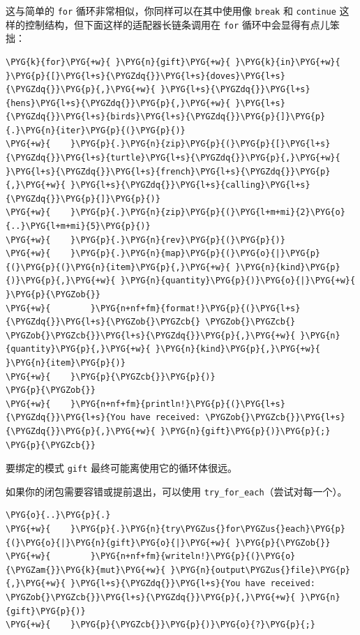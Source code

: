 这与简单的 \texttt{for} 循环非常相似，你同样可以在其中使用像 \texttt{break} 和 \texttt{continue} 这样的控制结构，但下面这样的适配器长链条调用在 \texttt{for} 循环中会显得有点儿笨拙：

\begin{Verbatim}[commandchars=\\\{\},breaklines=true,breakanywhere=true,fontsize=\codefont,xleftmargin=17bp]
\PYG{k}{for}\PYG{+w}{ }\PYG{n}{gift}\PYG{+w}{ }\PYG{k}{in}\PYG{+w}{ }\PYG{p}{[}\PYG{l+s}{\PYGZdq{}}\PYG{l+s}{doves}\PYG{l+s}{\PYGZdq{}}\PYG{p}{,}\PYG{+w}{ }\PYG{l+s}{\PYGZdq{}}\PYG{l+s}{hens}\PYG{l+s}{\PYGZdq{}}\PYG{p}{,}\PYG{+w}{ }\PYG{l+s}{\PYGZdq{}}\PYG{l+s}{birds}\PYG{l+s}{\PYGZdq{}}\PYG{p}{]}\PYG{p}{.}\PYG{n}{iter}\PYG{p}{(}\PYG{p}{)}
\PYG{+w}{    }\PYG{p}{.}\PYG{n}{zip}\PYG{p}{(}\PYG{p}{[}\PYG{l+s}{\PYGZdq{}}\PYG{l+s}{turtle}\PYG{l+s}{\PYGZdq{}}\PYG{p}{,}\PYG{+w}{ }\PYG{l+s}{\PYGZdq{}}\PYG{l+s}{french}\PYG{l+s}{\PYGZdq{}}\PYG{p}{,}\PYG{+w}{ }\PYG{l+s}{\PYGZdq{}}\PYG{l+s}{calling}\PYG{l+s}{\PYGZdq{}}\PYG{p}{]}\PYG{p}{)}
\PYG{+w}{    }\PYG{p}{.}\PYG{n}{zip}\PYG{p}{(}\PYG{l+m+mi}{2}\PYG{o}{..}\PYG{l+m+mi}{5}\PYG{p}{)}
\PYG{+w}{    }\PYG{p}{.}\PYG{n}{rev}\PYG{p}{(}\PYG{p}{)}
\PYG{+w}{    }\PYG{p}{.}\PYG{n}{map}\PYG{p}{(}\PYG{o}{|}\PYG{p}{(}\PYG{p}{(}\PYG{n}{item}\PYG{p}{,}\PYG{+w}{ }\PYG{n}{kind}\PYG{p}{)}\PYG{p}{,}\PYG{+w}{ }\PYG{n}{quantity}\PYG{p}{)}\PYG{o}{|}\PYG{+w}{ }\PYG{p}{\PYGZob{}}
\PYG{+w}{        }\PYG{n+nf+fm}{format!}\PYG{p}{(}\PYG{l+s}{\PYGZdq{}}\PYG{l+s}{\PYGZob{}\PYGZcb{} \PYGZob{}\PYGZcb{} \PYGZob{}\PYGZcb{}}\PYG{l+s}{\PYGZdq{}}\PYG{p}{,}\PYG{+w}{ }\PYG{n}{quantity}\PYG{p}{,}\PYG{+w}{ }\PYG{n}{kind}\PYG{p}{,}\PYG{+w}{ }\PYG{n}{item}\PYG{p}{)}
\PYG{+w}{    }\PYG{p}{\PYGZcb{}}\PYG{p}{)}
\PYG{p}{\PYGZob{}}
\PYG{+w}{    }\PYG{n+nf+fm}{println!}\PYG{p}{(}\PYG{l+s}{\PYGZdq{}}\PYG{l+s}{You have received: \PYGZob{}\PYGZcb{}}\PYG{l+s}{\PYGZdq{}}\PYG{p}{,}\PYG{+w}{ }\PYG{n}{gift}\PYG{p}{)}\PYG{p}{;}
\PYG{p}{\PYGZcb{}}
\end{Verbatim}

要绑定的模式 \texttt{gift} 最终可能离使用它的循环体很远。

如果你的闭包需要容错或提前退出，可以使用 \texttt{try\_for\_each}（尝试对每一个）。

\begin{Verbatim}[commandchars=\\\{\},breaklines=true,breakanywhere=true,fontsize=\codefont,xleftmargin=17bp]
\PYG{o}{..}\PYG{p}{.}
\PYG{+w}{    }\PYG{p}{.}\PYG{n}{try\PYGZus{}for\PYGZus{}each}\PYG{p}{(}\PYG{o}{|}\PYG{n}{gift}\PYG{o}{|}\PYG{+w}{ }\PYG{p}{\PYGZob{}}
\PYG{+w}{        }\PYG{n+nf+fm}{writeln!}\PYG{p}{(}\PYG{o}{\PYGZam{}}\PYG{k}{mut}\PYG{+w}{ }\PYG{n}{output\PYGZus{}file}\PYG{p}{,}\PYG{+w}{ }\PYG{l+s}{\PYGZdq{}}\PYG{l+s}{You have received: \PYGZob{}\PYGZcb{}}\PYG{l+s}{\PYGZdq{}}\PYG{p}{,}\PYG{+w}{ }\PYG{n}{gift}\PYG{p}{)}
\PYG{+w}{    }\PYG{p}{\PYGZcb{}}\PYG{p}{)}\PYG{o}{?}\PYG{p}{;}
\end{Verbatim}

